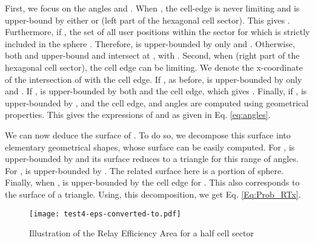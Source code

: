 \documentclass[journal]{IEEEtran}
\theoremstyle{definition}
\begin{document}
First, we focus on the angles  and .
When , the cell-edge is never limiting and  is upper-bound by either  or  (left part of the hexagonal cell sector). This gives .
Furthermore, if , the set of all user positions within the sector for which  is strictly included in the sphere . Therefore,  is upper-bounded by  only and . 
Otherwise, both  and  upper-bound  and intersect at , with .
Second, when  (right part of the hexagonal cell sector), the cell edge can be limiting. We denote  the x-coordinate of the intersection of  with the cell edge.
If , as before,  is upper-bounded by  only and .
If ,  is upper-bounded by both  and the cell edge, which gives .
Finally, if ,  is upper-bounded by ,  and the cell edge, and angles are computed using geometrical properties.
This gives the expressions of  and  as given in Eq. \eqref{eq:angles}.

We can now deduce the surface of . To do so, we decompose this surface into elementary geometrical shapes, whose surface can be easily computed.
For ,  is upper-bounded by  and its surface reduces to a triangle for this range of angles.
For ,  is upper-bounded by . The related surface here is a portion of sphere. Finally, 
when ,  is upper-bounded by the cell edge for . This also corresponds to the surface of a triangle.
Using, this decomposition, we get Eq. \eqref{Eq:Prob_RTx}.



\begin{figure}
\centering \texttt{[image: test4-eps-converted-to.pdf]}
\caption{Illustration of the Relay Efficiency Area for a half cell sector} 
\label{fig:Proof_PRTx} 
\end{figure}





{\footnotesize 

}
\fontsize{10}{10}
\selectfont
\end{document}
